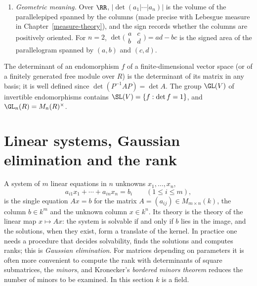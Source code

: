 \begin{example}
\begin{enumerate}
$x_2, \ldots, x_n$. Over a field it is nonzero exactly when the $x_i$ are distinct; this is why a polynomial of degree less than $n$ is determined by its values at $n$ distinct points.
\item \emph{Geometric meaning.} Over $\RR$, $|\det(a_1 | \cdots | a_n)|$ is the volume of the parallelepiped spanned by the columns (made precise with Lebesgue measure in Chapter~\ref{measure-theory}), and the sign
records whether the columns are positively oriented. For $n = 2$, $\det\bigl(\begin{smallmatrix}a & c\\ b & d\end{smallmatrix}\bigr) = ad - bc$ is the signed area of the parallelogram spanned by $(a, b)$ and
$(c, d)$.
\end{enumerate}
\end{example}

\begin{definition}\label{linear-algebra:definition-determinant-endomorphism}
The determinant of an endomorphism $f$ of a finite-dimensional vector space (or of a finitely
generated free module over $R$) is the determinant of its matrix in any basis; it is well defined
since $\det(P^{-1}AP) = \det A$. The group $\GL(V)$ of invertible endomorphisms contains
$\SL(V) = \{f : \det f = 1\}$, and $\GL_n(R) = M_n(R)^\times$.
\end{definition}

\section{Linear systems, Gaussian elimination and the rank}\label{linear-algebra:section-linear-systems}

A system of $m$ linear equations in $n$ unknowns $x_1, \ldots, x_n$,
\[
a_{i1}x_1 + \cdots + a_{in}x_n = b_i \qquad (1 \leq i \leq m),
\]
is the single equation $Ax = b$ for the matrix $A = (a_{ij}) \in M_{m \times n}(k)$, the column $b \in k^m$ and the unknown column $x \in k^n$. Its theory is the theory of the linear map
$x \mapsto Ax$: the system is solvable if and only if $b$ lies in the image, and the solutions, when they exist, form a translate of the kernel. In practice one needs a procedure that decides
solvability, finds the solutions and computes ranks; this is \emph{Gaussian elimination}. For matrices depending on parameters it is often more convenient to compute the rank with determinants of
square submatrices, the \emph{minors}, and Kronecker's \emph{bordered minors theorem} reduces the number of minors to be examined. In this section $k$ is a field.

